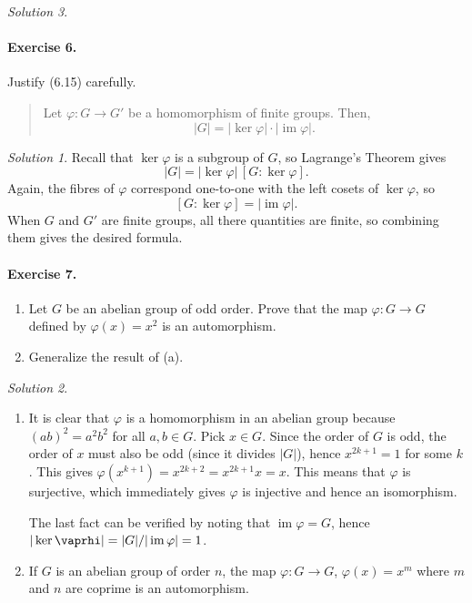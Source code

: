 \documentclass[11pt]{report}
\DeclareMathOperator\im{im}
\theoremstyle{remark}
\newtheorem*{solution}{Solution}
\begin{document}
\begin{solution}
    \paragraph{Exercise 6.} Justify (6.15) carefully.
    \begin{quote}
        Let $\varphi\colon G \to G'$ be a homomorphism of finite groups. Then, \[
            |G| = |\ker{\varphi}| \cdot |\im{\varphi}|. 
        \] 
    \end{quote}
    \begin{solution}
        Recall that $\ker{\varphi}$ is a subgroup of $G$, so Lagrange's Theorem
        gives \[
            |G| = |\ker{\varphi}|\,[G: \ker{\varphi}].
        \] Again, the fibres of $\varphi$ correspond one-to-one with the left cosets
        of $\ker\varphi$, so \[
            [G:\ker{\varphi}] = |\im{\varphi}|.
        \] When $G$ and $G'$ are finite groups, all there quantities are finite, so
        combining them gives the desired formula.
    \end{solution}
    
    \paragraph{Exercise 7.} \mbox{}
    \begin{enumerate}
        \itemsep0em    
        \item Let $G$ be an abelian group of odd order. Prove that the map
        $\varphi\colon G \to G$ defined by $\varphi(x) = x^2$ is an automorphism.
        \item Generalize the result of (a).
    \end{enumerate}
    \begin{solution} \mbox{}
    \begin{enumerate}
        \item It is clear that $\varphi$ is a homomorphism in an abelian group
        because $(ab)^2 = a^2 b^2$ for all $a, b \in G$.  Pick $x \in G$. Since the
        order of $G$ is odd, the order of $x$ must also be odd (since it divides
        $|G|$), hence $x^{2k + 1} = 1$ for some $k$.  This gives $\varphi(x^{k + 1})
        = x^{2k + 2} = x^{2k + 1}x = x$. This means that $\varphi$ is surjective,
        which immediately gives $\varphi$ is injective and hence an isomorphism.

        The last fact can be verified by noting that $\im{\varphi} = G$, hence
        $|\ker{\vaprhi}| = |G| / |\im{\varphi}| = 1$.

        \item If $G$ is an abelian group of order $n$, the map $\varphi\colon G \to
        G$, $\varphi(x) = x^m$ where $m$ and $n$ are coprime is an automorphism.
        

\end{enumerate}
\end{solution}
\end{solution}
\end{document}

